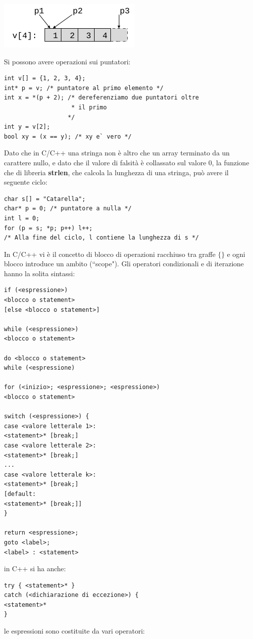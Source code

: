 \documentclass[a4paper,12pt, oneside]{book}
\begin{document}
\begin{center}
\includegraphics[scale=3]{img/c3.png}
\end{center}
Si possono avere operazioni sui puntatori:
\begin{verbatim}
int v[] = {1, 2, 3, 4};
int* p = v; /* puntatore al primo elemento */
int x = *(p + 2); /* dereferenziamo due puntatori oltre
                   * il primo
                  */
int y = v[2];
bool xy = (x == y); /* xy e` vero */
\end{verbatim}
Dato che in C/C++ una stringa non è altro che un array
terminato da un carattere nullo, e dato che il valore di falsità è collassato sul valore 0, la funzione che di libreria \textbf{strlen}, che calcola la lunghezza di una stringa, può avere il seguente ciclo:
\begin{verbatim}
char s[] = "Catarella";
char* p = 0; /* puntatore a nulla */
int l = 0;
for (p = s; *p; p++) l++;
/* Alla fine del ciclo, l contiene la lunghezza di s */
\end{verbatim}
In C/C++ vi è il concetto di blocco di operazioni racchiuso tra graffe $\{\}$ e ogni blocco introduce un ambito (“scope"). Gli operatori condizionali e di iterazione hanno la solita sintassi:
\begin{verbatim}
if (<espressione>)
<blocco o statement>
[else <blocco o statement>]

while (<espressione>)
<blocco o statement>

do <blocco o statement>
while (<espressione)

for (<inizio>; <espressione>; <espressione>)
<blocco o statement>

switch (<espressione>) {
case <valore letterale 1>:
<statement>* [break;]
case <valore letterale 2>:
<statement>* [break;]
...
case <valore letterale k>:
<statement>* [break;]
[default:
<statement>* [break;]]
}

return <espressione>;
goto <label>;
<label> : <statement>
\end{verbatim}
in C++ si ha anche:
\begin{verbatim}
try { <statement>* }
catch (<dichiarazione di eccezione>) {
<statement>*
}
\end{verbatim}
\newpage
le espressioni sono costituite da vari operatori:
\end{document}
